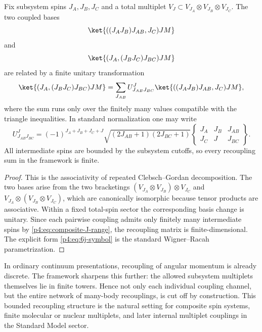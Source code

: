 \documentclass[12pt,a4paper]{article}
\begin{document}
\begin{theorem}
\label{p4:thm:finite-recoupling}
Fix subsystem spins \(J_A,J_B,J_C\) and a total multiplet \(V_J\subset V_{J_A}\otimes V_{J_B}\otimes V_{J_C}\).
The two coupled bases
\begin{equation}
\label{p4:eq:ab-coupling}
\ket{((J_AJ_B)J_{AB},J_C)JM}
\end{equation}
and
\begin{equation}
\label{p4:eq:bc-coupling}
\ket{(J_A,(J_BJ_C)J_{BC})JM}
\end{equation}
are related by a finite unitary transformation
\begin{equation}
\label{p4:eq:6j-recoupling}
\ket{(J_A,(J_BJ_C)J_{BC})JM}
=
\sum_{J_{AB}} U^J_{J_{AB}J_{BC}}
\ket{((J_AJ_B)J_{AB},J_C)JM},
\end{equation}
where the sum runs only over the finitely many values compatible with the triangle inequalities.
In standard normalization one may write
\begin{equation}
\label{p4:eq:6j-symbol}
U^J_{J_{AB}J_{BC}}
=
(-1)^{J_A+J_B+J_C+J}
\sqrt{(2J_{AB}+1)(2J_{BC}+1)}
\begin{Bmatrix}
J_A & J_B & J_{AB}\\
J_C & J   & J_{BC}
\end{Bmatrix}.
\end{equation}
All intermediate spins are bounded by the subsystem cutoffs, so every recoupling sum in the framework is finite.
\end{theorem}

\begin{proof}
This is the associativity of repeated Clebsch--Gordan decomposition.
The two bases arise from the two bracketings
\((V_{J_A}\otimes V_{J_B})\otimes V_{J_C}\) and \(V_{J_A}\otimes(V_{J_B}\otimes V_{J_C})\), which are canonically isomorphic because tensor products are associative.
Within a fixed total-spin sector the corresponding basis change is unitary.
Since each pairwise coupling admits only finitely many intermediate spins by \eqref{p4:eq:composite-J-range}, the recoupling matrix is finite-dimensional.
The explicit form \eqref{p4:eq:6j-symbol} is the standard Wigner--Racah parametrization.
\end{proof}

\begin{remark}
\label{p4:rem:finite-recoupling}
In ordinary continuum presentations, recoupling of angular momentum is already
discrete.  The framework sharpens this further: the allowed subsystem
multiplets themselves lie in finite towers.  Hence not only each individual
coupling channel, but the entire network of many-body recouplings, is cut off
by construction.  This bounded recoupling structure is the natural setting for
composite spin systems, finite molecular or nuclear multiplets, and later
internal multiplet couplings in the Standard Model sector.
\end{remark}
\end{document}
